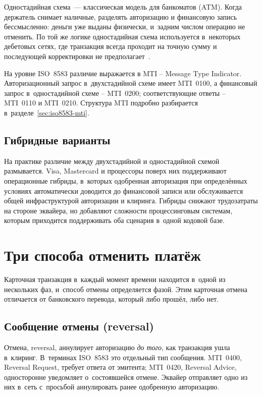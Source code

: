 Одностадийная схема~--- классическая модель для банкоматов (ATM).
Когда держатель снимает наличные, разделять авторизацию и финансовую
запись бессмысленно: деньги уже выданы физически, и~задним числом
операцию не отменить. По той же логике одностадийная схема используется
в~некоторых дебетовых сетях, где транзакция всегда проходит на точную
сумму и последующей корректировки не предполагает~\cite{visa-core-rules,mc-tpr}.

На уровне ISO~8583 различие выражается в MTI -- Message Type
Indicator. Авторизационный запрос в~двухстадийной схеме имеет MTI~0100,
а финансовый запрос в~одностадийной схеме -- MTI~0200;
соответствующие ответы -- MTI~0110 и MTI~0210. Структура MTI подробно
разбирается в~разделе~\ref{sec:iso8583-mti}.

\subsection*{Гибридные варианты}

На практике различие между двухстадийной и одностадийной схемой
размывается. Visa, Mastercard и процессоры поверх них поддерживают
операционные гибриды, в~которых одобренная авторизация при
определённых условиях автоматически доводится до финансовой записи
или обслуживается общей инфраструктурой авторизации и клиринга.
Гибриды снижают трудозатраты на стороне эквайера, но добавляют сложности
процессинговым системам, которым приходится поддерживать оба сценария
в~одной кодовой базе.

\section{Три способа отменить платёж}\label{sec:tx-cancellation}

Карточная транзакция в~каждый момент времени находится в~одной из нескольких фаз,
и~способ отмены определяется фазой. Этим карточная отмена отличается
от банковского перевода, который либо прошёл, либо нет.

\subsection*{Сообщение отмены (reversal)}

Отмена, reversal, аннулирует авторизацию \emph{до того}, как
транзакция ушла в~клиринг. В~терминах ISO~8583 это отдельный тип
сообщения. MTI~0400, Reversal Request, требует ответа от эмитента;
MTI~0420, Reversal Advice, односторонне уведомляет о~состоявшейся
отмене. Эквайер отправляет одно из них в~сеть с~просьбой
аннулировать ранее одобренную авторизацию.

